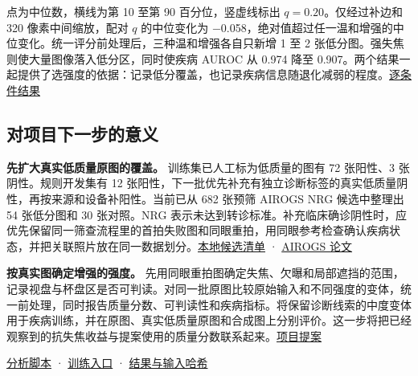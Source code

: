 \documentclass[
  11pt,
]{article}
\begin{document}
点为中位数，横线为第 10 至第 90 百分位，竖虚线标出
\(q=0.20\)。仅经过补边和 320 像素中间缩放，配对 \(q\) 的中位变化为
−0.058，绝对值超过任一温和增强的中位变化。统一评分前处理后，三种温和增强各自只新增
1 至 2 张低分图。强失焦则使大量图像落入低分区，同时使疾病 AUROC 从 0.974
降至
0.907。两个结果一起提供了选强度的依据：记录低分覆盖，也记录疾病信息随退化减弱的程度。\href{paired-summary.json}{逐条件结果}

\subsection{对项目下一步的意义}\label{ux5bf9ux9879ux76eeux4e0bux4e00ux6b65ux7684ux610fux4e49}

\textbf{先扩大真实低质量原图的覆盖。} 训练集已人工标为低质量的图有 72
张阳性、3 张阴性。规则开发集有 12
张阳性，下一批优先补充有独立诊断标签的真实低质量阴性，再按来源和设备补阳性。当前已从
682 张预筛 AIROGS NRG 候选中整理出 54 张低分图和 30 张对照。NRG
表示未达到转诊标准。补充临床确诊阴性时，应优先保留同一筛查流程里的首拍失败图和同眼重拍，用同眼参考检查确认疾病状态，并把关联照片放在同一数据划分。\href{../../../runs/quality_alignment_20261116/airogs_blinded_quality_review.csv}{本地候选清单}
· \href{https://arxiv.org/html/2302.01738}{AIROGS 论文}

\textbf{按真实图确定增强的强度。}
先用同眼重拍图确定失焦、欠曝和局部遮挡的范围，记录视盘与杯盘区是否可判读。对同一批原图比较原始输入和不同强度的变体，统一前处理，同时报告质量分数、可判读性和疾病指标。将保留诊断线索的中度变体用于疾病训练，并在原图、真实低质量原图和合成图上分别评价。这一步将把已经观察到的抗失焦收益与提案使用的质量分数联系起来。\href{../../../proposal-1106.pdf}{项目提案}

\href{../../../tools/analyze_matched_defocus_20261116.py}{分析脚本} ·
\href{../../../tools/run_matched_defocus_20261116.py}{训练入口} ·
\href{completed-matched-defocus.json}{结果与输入哈希}
\end{document}
